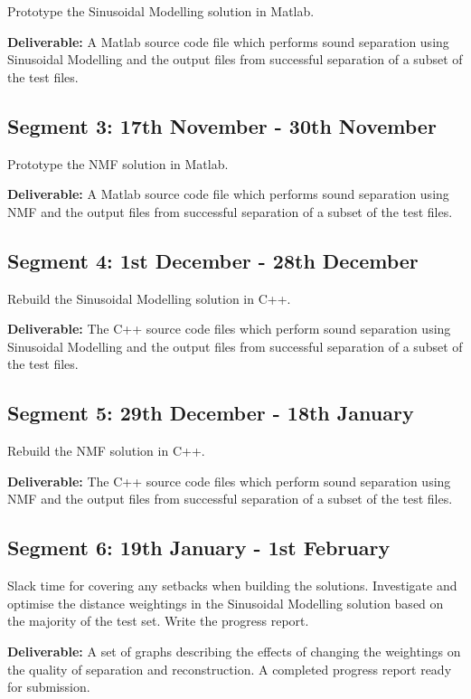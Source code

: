 \documentclass[12pt,a4paper,twoside,openright]{report}
\begin{document}
Prototype the Sinusoidal Modelling solution in Matlab.

\textbf{Deliverable:} A Matlab source code file which performs sound separation using Sinusoidal Modelling and the output files from successful separation of a subset of the test files.

\subsection*{Segment 3: 17th November - 30th November}

Prototype the NMF solution in Matlab.

\textbf{Deliverable:} A Matlab source code file which performs sound separation using NMF and the output files from successful separation of a subset of the test files.

\subsection*{Segment 4: 1st December - 28th December}

Rebuild the Sinusoidal Modelling solution in C++.

\textbf{Deliverable:} The C++ source code files which perform sound separation using Sinusoidal Modelling and the output files from successful separation of a subset of the test files.

\subsection*{Segment 5: 29th December - 18th January}

Rebuild the NMF solution in C++.

\textbf{Deliverable:} The C++ source code files which perform sound separation using NMF and the output files from successful separation of a subset of the test files.

\subsection*{Segment 6: 19th January - 1st February}

Slack time for covering any setbacks when building the solutions. Investigate and optimise the distance weightings in the Sinusoidal Modelling solution based on the majority of the test set. Write the progress report.

\textbf{Deliverable:} A set of graphs describing the effects of changing the weightings on the quality of separation and reconstruction. A completed progress report ready for submission.
\end{document}
